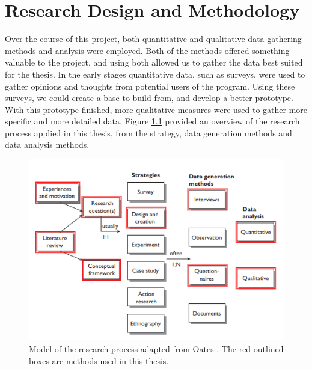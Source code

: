 
\chapter{Research Design and Methodology}
Over the course of this project, both quantitative and qualitative data gathering methods and analysis were employed. Both of the methods offered something valuable to the project, and using both allowed us to gather the data best suited for the thesis. In the early stages quantitative data, such as surveys, were used to gather opinions and thoughts from potential users of the program. Using these surveys, we could create a base to build from, and develop a better prototype. With this prototype finished, more qualitative measures were used to gather more specific and more detailed data. Figure \ref{fig:researchMethod} provided an overview of the research process applied in this thesis, from the strategy, data generation methods and data analysis methods.  

\begin{figure}[!ht]
     \centering
     \includegraphics[width=.8\textwidth]{./fig/researchMethodology/OatesResearch.png}
     \captionsetup{width=0.8\linewidth}
     \caption{Model of the research process adapted from Oates \cite{oates2005researching}. The red outlined boxes are methods used in this thesis.}
     \label{fig:researchMethod}
 \end{figure}

